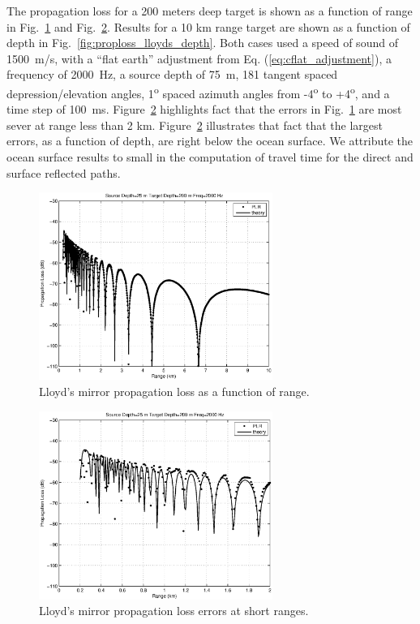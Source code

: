 \documentclass{ws-jca}
\begin{document}
The propagation loss for a 200 meters deep target is shown as a function of
range in Fig.~\ref{fig:proploss_lloyds_range} and
Fig.~\ref{fig:proploss_lloyds_range_zoom}. Results for a 10 km range target
are shown as a function of depth in Fig.~\ref{fig:proploss_lloyds_depth}.
Both cases used a speed of sound of 1500~m/s, with a ``flat earth''
adjustment from Eq. (\ref{eq:cflat_adjustment}), a frequency of 2000~Hz, a
source depth of 75~m, 181 tangent spaced depression/elevation angles,
1\textsuperscript{o} spaced azimuth angles from -4\textsuperscript{o} to
+4\textsuperscript{o}, and a time step of 100~ms.
Figure~\ref{fig:proploss_lloyds_range_zoom} highlights fact that the errors
in Fig.~\ref{fig:proploss_lloyds_range} are most sever at range less than 2
km. Figure~\ref{fig:proploss_lloyds_range_zoom} illustrates that fact that
the largest errors, as a function of depth, are right below the ocean
surface. We attribute the ocean surface results to small in the computation
of travel time for the direct and surface reflected paths.
\begin{figure}[th]
	\centerline{\includegraphics[width=3in]{proploss_lloyds_range.eps}} 
	\vspace*{8pt}
	\caption{Lloyd's mirror propagation loss as a function of range. 
	\label{fig:proploss_lloyds_range}}
\end{figure}
\begin{figure}[th]
	\centerline{\includegraphics[width=3in]{proploss_lloyds_range_zoom.eps}} 
	\vspace*{8pt}
	\caption{Lloyd's mirror propagation loss errors at short ranges.
	\label{fig:proploss_lloyds_range_zoom}}
\end{figure}
\end{document}
